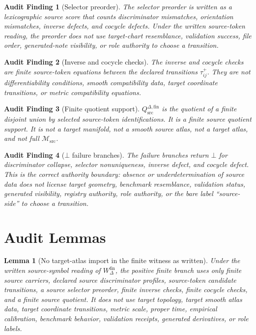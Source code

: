 \documentclass[11pt]{article}
\newcommand{\Msrc}{\mathcal{M}_{\mathrm{src}}}
\newcommand{\Qdisc}{Q_{\mathrm{src}}^{\Delta,\mathrm{fin}}}
\newcommand{\Bot}{\bot}
\newcommand{\Wfin}{W_{\Delta}^{\mathrm{fin}}}
\newtheorem{audit}{Audit Finding}
\newtheorem{lemma}{Lemma}
\begin{document}
\begin{audit}[Selector preorder]
The selector preorder is written as a lexicographic source score that counts
discriminator mismatches, orientation mismatches, inverse defects, and cocycle
defects. Under the written source-token reading, the preorder does not use
target-chart resemblance, validation success, file order, generated-note
visibility, or role authority to choose a transition.
\end{audit}

\begin{audit}[Inverse and cocycle checks]
The inverse and cocycle checks are finite source-token equations between the
declared transitions \(\tau_{ij}^{+}\). They are not differentiability
conditions, smooth compatibility data, target coordinate transitions, or
metric compatibility equations.
\end{audit}

\begin{audit}[Finite quotient support]
\(\Qdisc\) is the quotient of a finite disjoint union by selected source-token
identifications. It is a finite source quotient support. It is not a target
manifold, not a smooth source atlas, not a target atlas, and not full
\(\Msrc\).
\end{audit}

\begin{audit}[\(\Bot\) failure branches]
The failure branches return \(\Bot\) for discriminator collapse, selector
nonuniqueness, inverse defect, and cocycle defect. This is the correct
authority boundary: absence or underdetermination of source data does not
license target geometry, benchmark resemblance, validation status, generated
visibility, registry authority, role authority, or the bare label
``source-side'' to choose a transition.
\end{audit}

\section{Audit Lemmas}

\begin{lemma}[No target-atlas import in the finite witness as written]
Under the written source-symbol reading of \(\Wfin\), the positive finite
branch uses only finite source carriers, declared source discriminator
profiles, source-token candidate transitions, a source selector preorder,
finite inverse checks, finite cocycle checks, and a finite source quotient.
It does not use target topology, target smooth atlas data, target coordinate
transitions, metric scale, proper time, empirical calibration, benchmark
behavior, validation receipts, generated derivatives, or role labels.
\end{lemma}
\end{document}
